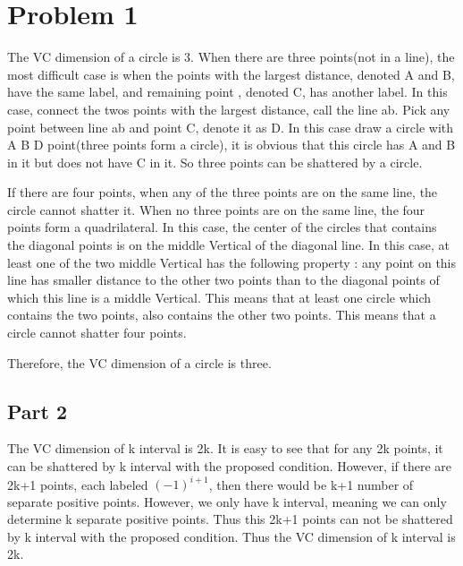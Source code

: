 

\oddsidemargin 0in
\evensidemargin 0in
\textwidth 6.5in
\topmargin -0.5in
\textheight 9.0in




\pagestyle{myheadings}  %
 
\section{Problem 1}
The VC dimension of a circle is 3. When there are three points(not in a line), the most difficult case is when the points with the largest distance, denoted A and B, have the same label, and remaining point , denoted C, has another label. In this case, connect the twos points with the largest distance, call the line ab. Pick any point between line ab and point C, denote it as D. In this case draw a circle with A B D point(three points form a circle), it is obvious that this circle has A and B in it but does not have C in it. So three points can be shattered by a circle.

If there are four points, when any of the three points are on the same line, the circle cannot shatter it. When no three points are on the same line, the four points form a quadrilateral. In this case, the center of the circles that contains the diagonal points is on the middle Vertical of the diagonal line. In this case, at least one of the two middle Vertical has the following property : any point on this line has smaller distance to the other two points than to the diagonal points of which this line is a middle Vertical. This means that at least one circle which contains the two points, also contains the other two points. This means that a circle cannot shatter four points.

Therefore, the VC dimension of a circle is three.

\subsection{Part 2}
The VC dimension of k interval is 2k. It is easy to see that for any 2k points, it can be shattered by k interval with the proposed condition. However, if there are 2k+1 points, each labeled $(-1)^{i+1}$, then there would be k+1 number of separate positive points. However, we only have k interval, meaning we can only determine k separate positive points. Thus this 2k+1 points can not be shattered by k interval with the proposed condition. Thus the VC dimension of k interval is 2k.

